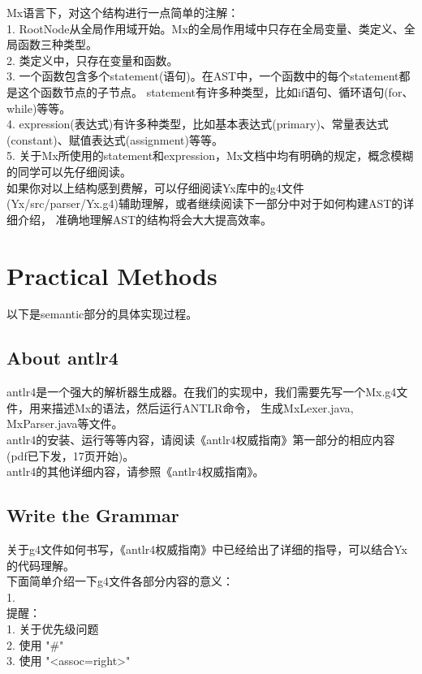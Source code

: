 Mx语言下，对这个结构进行一点简单的注解：\\
1. RootNode从全局作用域开始。Mx的全局作用域中只存在全局变量、类定义、全局函数三种类型。\\
2. 类定义中，只存在变量和函数。 \\
3. 一个函数包含多个statement(语句)。在AST中，一个函数中的每个statement都是这个函数节点的子节点。
statement有许多种类型，比如if语句、循环语句(for、while)等等。\\
4. expression(表达式)有许多种类型，比如基本表达式(primary)、常量表达式(constant)、赋值表达式(assignment)等等。 \\
5. 关于Mx所使用的statement和expression，Mx文档中均有明确的规定，概念模糊的同学可以先仔细阅读。 \\

如果你对以上结构感到费解，可以仔细阅读Yx库中的g4文件(Yx/src/parser/Yx.g4)辅助理解，或者继续阅读下一部分中对于如何构建AST的详细介绍，
准确地理解AST的结构将会大大提高效率。\\

\section{Practical Methods}
以下是semantic部分的具体实现过程。

\subsection{About antlr4}
antlr4是一个强大的解析器生成器。在我们的实现中，我们需要先写一个Mx.g4文件，用来描述Mx的语法，然后运行ANTLR命令，
生成MxLexer.java, MxParser.java等文件。\\

antlr4的安装、运行等等内容，请阅读《antlr4权威指南》第一部分的相应内容(pdf已下发，17页开始)。\\

antlr4的其他详细内容，请参照《antlr4权威指南》。

\subsection{Write the Grammar}
关于g4文件如何书写，《antlr4权威指南》中已经给出了详细的指导，可以结合Yx的代码理解。\\

下面简单介绍一下g4文件各部分内容的意义：\\
1. \\

提醒： \\
1. 关于优先级问题 \\
2. 使用 "\#"  \\
3. 使用 "<assoc=right>" \\


